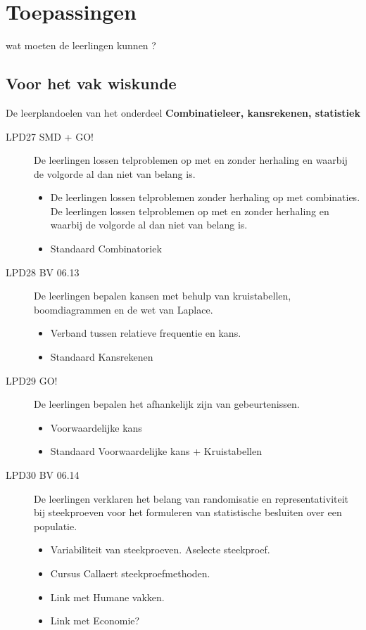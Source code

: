 \documentclass[a4paper,12pt, dutch, oneside ]{book}
\begin{document}
\chapter{Toepassingen}
wat moeten de leerlingen kunnen ?

\section{Voor het vak wiskunde}
De leerplandoelen van het onderdeel \textbf{Combinatieleer, kansrekenen, statistiek}

\begin{description}
\item[LPD27 SMD + GO!]De leerlingen lossen telproblemen op met en zonder herhaling en waarbij de volgorde al dan niet van belang is.
\begin{itemize}
    \item De leerlingen lossen telproblemen zonder herhaling op met combinaties. De leerlingen lossen telproblemen op met en zonder herhaling en waarbij de volgorde al dan niet van belang is.
    \item Standaard Combinatoriek
\end{itemize}

\item[LPD28 BV 06.13] De leerlingen bepalen kansen met behulp van kruistabellen, boomdiagrammen en de wet van Laplace.
\begin{itemize}
    \item Verband tussen relatieve frequentie en kans.
    \item Standaard Kansrekenen
\end{itemize}

\item[LPD29 GO!] De leerlingen bepalen het afhankelijk zijn van gebeurtenissen.
\begin{itemize}
    \item Voorwaardelijke kans
    \item  Standaard Voorwaardelijke kans + Kruistabellen
\end{itemize}

\item[LPD30 BV 06.14] De leerlingen verklaren het belang van randomisatie en representativiteit bij steekproeven voor het formuleren van statistische besluiten over een populatie.
\begin{itemize}
    \item Variabiliteit van steekproeven. Aselecte steekproef.
    \item Cursus Callaert steekproefmethoden.
    \item Link met Humane vakken.
    \item Link met Economie?
\end{itemize}


\end{description}
\end{document}
